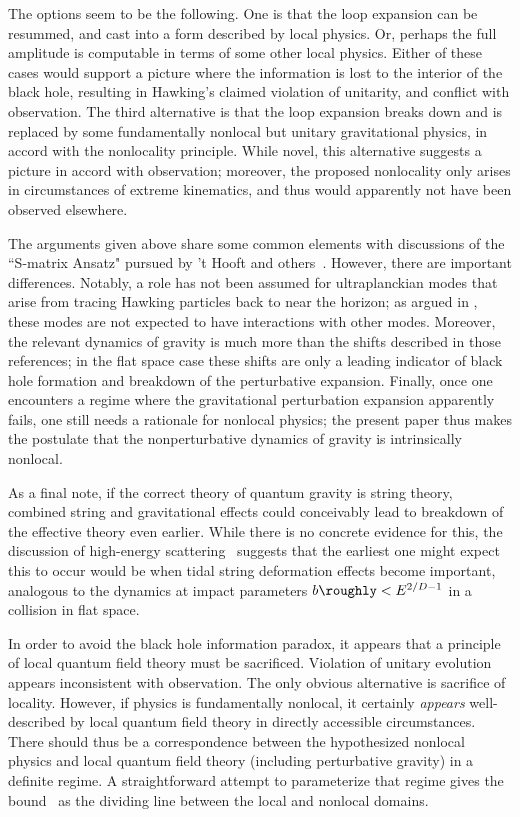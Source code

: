 The options seem to be the following.  One is that the loop expansion can be resummed, and cast into a form described by local physics.  Or, perhaps the full amplitude is computable in terms of some other local physics.  Either of these cases would support a picture where the information is lost to the interior of the black hole, resulting in Hawking's claimed violation of unitarity, and conflict with observation.  The third alternative is that the loop expansion breaks down and is replaced by some fundamentally nonlocal but unitary gravitational physics, in accord with the nonlocality principle.  While novel, this alternative suggests a picture in accord with observation; moreover, the proposed nonlocality only arises in circumstances of extreme kinematics, and thus would apparently not have been observed elsewhere.  

The arguments given above share some common elements with discussions of the ``S-matrix Ansatz" pursued by 't Hooft and others~.  However, there are important differences.  Notably, a role has not been assumed for ultraplanckian modes that arise from tracing Hawking particles back to near the horizon; as argued in \SGnonloc, these modes are not expected to have interactions with other modes.  Moreover, the relevant dynamics of gravity is much more than the shifts described in those references; in the flat space case these shifts are only a leading indicator of black hole formation and breakdown of the perturbative expansion.  Finally, once one encounters a regime where the gravitational perturbation expansion apparently fails, one still needs a rationale for nonlocal physics; the present paper thus makes the postulate that the nonperturbative dynamics of gravity is intrinsically nonlocal.


As a final note, if the correct theory of quantum gravity is string theory, combined string and gravitational effects could conceivably lead to breakdown of the effective theory even earlier.  While there is no concrete evidence for this, the discussion of high-energy scattering \LQGST\ suggests that the earliest one might expect this to occur would be when tidal string deformation effects become important, analogous to the dynamics at impact parameters $b\roughly< E^{2/D-1}$ in a collision in flat space.


In order to avoid the black hole information paradox, it appears that a principle of local quantum field theory must be sacrificed.  Violation of unitary evolution appears inconsistent with observation\BPS.  The only obvious alternative is sacrifice of locality.  However, if physics is fundamentally nonlocal, it certainly {\it appears} well-described by local quantum field theory in directly accessible circumstances.  There should thus be a correspondence between the hypothesized nonlocal physics and local quantum field theory (including perturbative gravity) in a definite regime.  A straightforward attempt to parameterize that regime  gives the bound \gravbd\ as the dividing line between the local and nonlocal domains.

